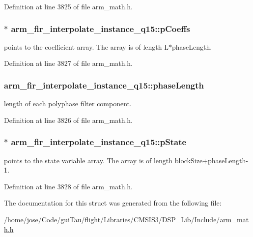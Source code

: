 Definition at line 3825 of file arm\-\_\-math.\-h.

\hypertarget{structarm__fir__interpolate__instance__q15_a767d91d61d4c0beeddd4325d28d28e24}{
\subsubsection[{p\-Coeffs}]{$\ast$ arm\-\_\-fir\-\_\-interpolate\-\_\-instance\-\_\-q15\-::p\-Coeffs}}\label{structarm__fir__interpolate__instance__q15_a767d91d61d4c0beeddd4325d28d28e24}
points to the coefficient array. The array is of length L$\ast$phase\-Length. 

Definition at line 3827 of file arm\-\_\-math.\-h.

\hypertarget{structarm__fir__interpolate__instance__q15_ad5178a02a697a77e0d0e60705d9f0a19}{
\subsubsection[{phase\-Length}]{ arm\-\_\-fir\-\_\-interpolate\-\_\-instance\-\_\-q15\-::phase\-Length}}\label{structarm__fir__interpolate__instance__q15_ad5178a02a697a77e0d0e60705d9f0a19}
length of each polyphase filter component. 

Definition at line 3826 of file arm\-\_\-math.\-h.

\hypertarget{structarm__fir__interpolate__instance__q15_a26b864363fa47954248f2590e3a82a3c}{
\subsubsection[{p\-State}]{$\ast$ arm\-\_\-fir\-\_\-interpolate\-\_\-instance\-\_\-q15\-::p\-State}}\label{structarm__fir__interpolate__instance__q15_a26b864363fa47954248f2590e3a82a3c}
points to the state variable array. The array is of length block\-Size+phase\-Length-\/1. 

Definition at line 3828 of file arm\-\_\-math.\-h.



The documentation for this struct was generated from the following file\-:\begin{DoxyCompactItemize}
\item 
/home/jose/\-Code/gui\-Tau/flight/\-Libraries/\-C\-M\-S\-I\-S3/\-D\-S\-P\-\_\-\-Lib/\-Include/\hyperlink{arm__math_8h}{arm\-\_\-math.\-h}\end{DoxyCompactItemize}
